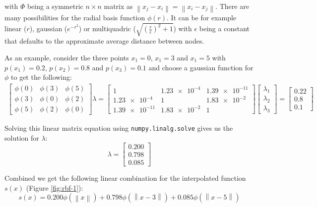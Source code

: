 with $\Phi$ being a symmetric $n \times n $ matrix as $\left\|x_j-x_i\right\|=\left\|x_i-x_j\right\|$. There are many possibilities for the radial basis function $\phi(r)$. It can be for example linear ($r$), gaussian ($e^{-r^2}$) or multiquadric ($\sqrt{\left(\frac{r}{\epsilon}\right)^2 + 1}$) with $\epsilon$ being a constant that defaults to the approximate average distance between nodes.

As an example, consider the three points $x_1=0$, $x_1=3$ and $x_1=5$ with $p(x_1)=0.2$, $p(x_2)=0.8$ and $p(x_3)=0.1$ and choose a gaussian function for $\phi$ to get the following:
\begin{align}
	\begin{bmatrix}
		\phi(0) & \phi(3)  & \phi(5) \\
		\phi(3) & \phi(0) & \phi(2) \\
		\phi(5) & \phi(2)  & \phi(0)
	\end{bmatrix} 
	\lambda
	=
		\begin{bmatrix}
			1              & \num{1.23e-4} & \num{1.39e-11} \\
			\num{1.23e-4}  & 1             & \num{1.83e-2}  \\
			\num{1.39e-11} & \num{1.83e-2} & 1
		\end{bmatrix} 
	\begin{bmatrix}
\lambda_1 \\
\lambda_2 \\
\lambda_3
\end{bmatrix}
=
\begin{bmatrix}
0.22\\0.8\\0.1
\end{bmatrix}
\end{align}

Solving this linear matrix equation using \texttt{numpy.linalg.solve} gives us the solution for $\lambda$:
\begin{equation}
	\lambda=\begin{bmatrix}
	0.200 \\0.798  \\0.085
	\end{bmatrix}
\end{equation}

Combined we get the following linear combination for the interpolated function $s(x)$ (Figure \ref{fig:rbf-1}):
\begin{equation}
	s(x)=0.200\phi(\left\|x\right\|)+
		0.798\phi(\left\|x-3\right\|)+
		0.085\phi(\left\|x-5\right\|)
\end{equation}



